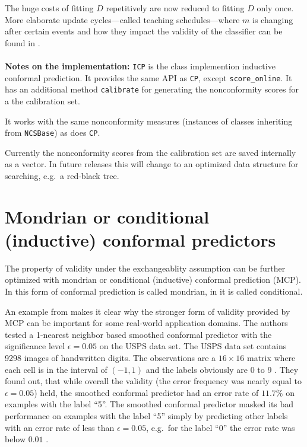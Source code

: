 \documentclass[twoside,11pt]{article}
\begin{document}
The huge costs of fitting $D$ repetitively are now reduced
to fitting $D$ only once.
More elaborate update cycles---called teaching
schedules---where $m$ is changing after certain events
and how they impact the validity of the classifier can be
found in \citet[Chapters 4.3, 4.4]{alrw}.
\\\\

\noindent
\textbf{Notes on the implementation:}
\texttt{ICP} is the class implemention inductive conformal
prediction. It provides the same API as \texttt{CP},
except \texttt{score\_online}. It has an additional method
\texttt{calibrate} for generating the nonconformity scores
for a the calibration set.

It works with the same nonconformity measures (instances
of classes inheriting from \texttt{NCSBase}) as does
\texttt{CP}.

Currently the nonconformity scores from the calibration set
are saved internally as a vector. In future releases this
will change to an optimized data structure for searching,
e.g.\ a red-black tree.

\section{Mondrian or conditional (inductive) conformal
         predictors}
\label{sec:mcp}

The property of validity under the exchangeablity
assumption can be further optimized with mondrian or
conditional (inductive) conformal prediction (MCP).
In \citet[Chapter 4.5]{alrw} this form of conformal
prediction is called mondrian, in \citet[Chapter 2]{cprml}
it is called conditional.

An example from \citet[Chapter 4.5]{alrw} makes it clear
why the stronger form of validity provided by MCP can be
important for some real-world application domains.
The authors tested a 1-nearest neighbor based smoothed
conformal predictor with the significance level
$\epsilon=0.05$ on the USPS data set.
The USPS data set contains 9298 images of handwritten
digits.
The observations are a $16 \times 16$ matrix where each
cell is in the interval of $(-1,1)$ and the labels
obviously are 0 to 9 \citep[see][]{lecun_et_al_1989}.
They found out, that while overall the validity (the error
frequency was nearly equal to $\epsilon=0.05$) held, the
smoothed conformal predictor had an error rate of $11.7\%$
on examples with the label ``5''.
The smoothed conformal predictor masked its bad performance
on examples with the label ``5'' simply by predicting other
labels with an error rate of less than $\epsilon = 0.05$,
e.g.\ for the label ``0'' the error rate was below $0.01$
\citep[see][Chapter 4.5]{alrw}.
\end{document}
